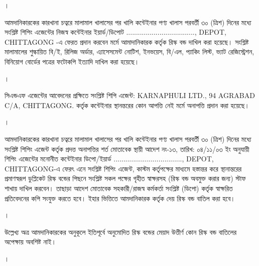 \documentclass[12pt]{article}
\newcommand{\rdepo}{..................................., DEPOT, CHITTAGONG}
\newcommand{\karnaphuli}{KARNAPHULI LTD.}
\newcommand{\karnaphulia}{94 AGRABAD C/A, CHITTAGONG.}
\newcommand{\san}{\karnaphuli}
\newcommand{\sad}{\karnaphulia}
\begin{document}
\begin{minipage}[t]{0.04\linewidth}
।
\end{minipage}
\begin{minipage}[t]{0.96\linewidth}
আমদানিকারকের কারখানা চত্বরে মালামাল
খালাসের পর খালি কন্টেইনার পণ্য খালাস
পরবর্তী ৩০ (ত্রিশ) দিনের মধ্যে
সংশ্লিষ্ট শিপিং এজেন্টের নিজস্ব কন্টেইনার
ইয়ার্ড/ডিপোট {\rdepo} -এ ফেরত প্রদান করবেন
মর্মে আমাদানিকারক কর্তৃক রিস্ক বন্ড দাখিল
করা হয়েছে।
সংশ্লিষ্ট মালামালের শুল্কায়িত বি/ই,
রিলিজ অর্ডার, এ্যাসেসমেন্ট নোটিশ,
ইনভয়েস, বি/এল, প্যাকিং লিস্ট,
ভ্যাট রেজিস্ট্রেশন, বিনিয়োগ বোর্ডের
পত্রের ফটোকপি ইত্যাদি দাখিল করা হয়েছে।
\\
\end{minipage}
\begin{minipage}[t]{0.04\linewidth}
।
\end{minipage}
\begin{minipage}[t]{0.96\linewidth}
সিএন্ডএফ এজেন্টের আবেদনের প্রক্ষিতে
সংশ্লিষ্ট শিপি এজেন্ট:
{\san}, {\sad}
কর্তৃক কন্টেইনার স্থানন্তরের কোন আপত্তি নেই
মর্মে অনাপত্তি প্রদান করা হয়েছে।
\\
\end{minipage}
\begin{minipage}[t]{0.04\linewidth}
।
\end{minipage}
\begin{minipage}[t]{0.96\linewidth}
আমদানিকারকের কারখানা চত্বরে মালামাল
খালাসের পর খালি কন্টেইনার পণ্য খালাস পরবর্তী
৩০ (ত্রিশ) দিনের মধ্যে
সংশ্লিষ্ট শিপিং এজেন্ট কর্তৃক প্রদত্ত
অনাপত্তির শর্ত মোতাবেক
স্থায়ী আদেশ নং-১৩,
তারিখ: ০৪/১১/০৩ ইং
অনুযায়ী শিপিং এজেন্টের মনোনীত
কন্টেইনার ডিপো/ইয়ার্ড {\rdepo}-এ
ফেরৎ এনে সংশ্লিষ্ট শিপিং এজেন্ট,
কাস্টম কর্তৃপক্ষের মাধ্যমে হস্তান্তর করে
স্থানান্তরের প্রমাণস্বরূপ ডুপ্লিকেট রিস্ক বন্ডের পিছনে
সংশ্লিষ্ট সকল পক্ষের গৃহীত স্বাক্ষরসহ
(রিস্ক বন্ড অবমুক্ত করার জন্য)
স্টাফ শাখায় দাখিল করবেন।
তাছাড়া আদেশ মোতাবেক
সহকারী/রাজস্ব কর্মকর্তা সংশ্লিষ্ট (ডিপো) কর্তৃক
স্বাক্ষরিত প্রতিবেদনের কপি সংযুক্ত করতে হবে।
ইহার ভিত্তিতে আমদানিকারক কর্তৃক দেয়
রিস্ক বন্ড বাতিল করা হবে।
\\
\end{minipage}
\begin{minipage}[t]{0.04\linewidth}
।
\end{minipage}
\begin{minipage}[t]{0.96\linewidth}
উল্লেখ্য অত্র আমদানিকারকের অনুকূলে ইতিপূর্বে
অনুমোদিত রিস্ক বন্ডের মেয়াদ উত্তীর্ণ কোন
রিস্ক বন্ড বাতিলের অপেক্ষায় অবশিষ্ট নাই।
\\
\end{minipage}
\begin{minipage}[t]{0.04\linewidth}
।
\end{minipage}
\end{document}
